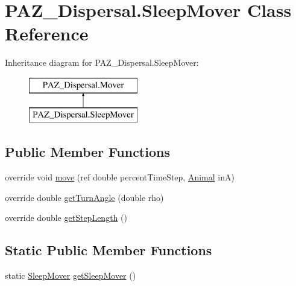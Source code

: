\hypertarget{class_p_a_z___dispersal_1_1_sleep_mover}{\section{P\-A\-Z\-\_\-\-Dispersal.\-Sleep\-Mover Class Reference}
\label{class_p_a_z___dispersal_1_1_sleep_mover}
}


 


Inheritance diagram for P\-A\-Z\-\_\-\-Dispersal.\-Sleep\-Mover\-:\begin{figure}[H]
\begin{center}
\leavevmode
\includegraphics[height=2.000000cm]{class_p_a_z___dispersal_1_1_sleep_mover}
\end{center}
\end{figure}
\subsection*{Public Member Functions}
\begin{DoxyCompactItemize}
\item 
override void \hyperlink{class_p_a_z___dispersal_1_1_sleep_mover_a7f13059a4c0ba6bf54e46005d3ef6a29}{move} (ref double percent\-Time\-Step, \hyperlink{class_p_a_z___dispersal_1_1_animal}{Animal} in\-A)
\item 
override double \hyperlink{class_p_a_z___dispersal_1_1_sleep_mover_af4cae2f27a442bde3d8baf8e76239c22}{get\-Turn\-Angle} (double rho)
\item 
override double \hyperlink{class_p_a_z___dispersal_1_1_sleep_mover_aa61e3466900a1c0a2e21d97316e6c718}{get\-Step\-Length} ()
\end{DoxyCompactItemize}
\subsection*{Static Public Member Functions}
\begin{DoxyCompactItemize}
\item 
static \hyperlink{class_p_a_z___dispersal_1_1_sleep_mover}{Sleep\-Mover} \hyperlink{class_p_a_z___dispersal_1_1_sleep_mover_adf8475a959b754a89592d0e07fd058ed}{get\-Sleep\-Mover} ()
\end{DoxyCompactItemize}
